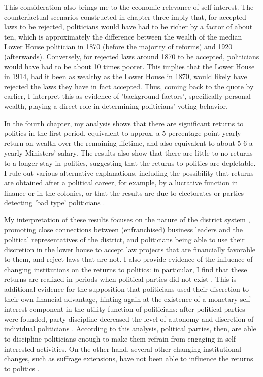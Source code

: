 This consideration also brings me to the economic relevance of self-interest. The counterfactual scenarios constructed in chapter three imply that, for accepted laws to be rejected, politicians would have had to be richer by a factor of about ten, which is approximately the difference between the wealth of the median Lower House politician in 1870 (before the majority of reforms) and 1920 (afterwards). Conversely, for rejected laws around 1870 to be accepted, politicians would have had to be about 10 times poorer. This implies that the Lower House in 1914, had it been as wealthy as the Lower House in 1870, would likely have rejected the laws they have in fact accepted. Thus, coming back to the quote by \cite{van1983toegang} earlier, I interpret this as evidence of 'background factors', specifically personal wealth, playing a direct role in determining politicians' voting behavior. 

In the fourth chapter, my analysis shows that there are significant returns to politics in the first period, equivalent to approx. a 5 percentage point yearly return on wealth over the remaining lifetime, and also equivalent to about 5-6 a yearly Ministers' salary. The results also show that there are little to no returns to a longer stay in politics, suggesting that the returns to politics are depletable. I rule out various alternative explanations, including the possibility that returns are obtained after a political career, for example, by a lucrative function in finance or in the colonies, or that the results are due to electorates or parties detecting 'bad type' politicians \citep{besley1995does}. 

My interpretation of these results focuses on the nature of the district system \citep{van2018tussen}, promoting close connections between (enfranchised) business leaders and the political representatives of the district, and politicians being able to use their discretion in the lower house to accept law projects that are financially favorable to them, and reject laws that are not. I also provide evidence of the influence of changing institutions on the returns to politics: in particular, I find that these returns are realized in periods when political parties did not exist \citep[cf.][]{eggers2009mps}. This is additional evidence for the supposition that politicians used their discretion to their own financial advantage, hinting again at the existence of a monetary self-interest component in the utility function of politicians: after political parties were founded, party discipline decreased the level of autonomy and discretion of individual politicians \citep{de2001antirevolutionaire,de2014ons}. According to this analysis, political parties, then, are able to discipline politicians enough to make them refrain from engaging in self-interested activities. On the other hand, several other changing institutional changes, such as suffrage extensions, have not been able to influence the returns to politics \citep[see also][]{ashworth2010does}. 

